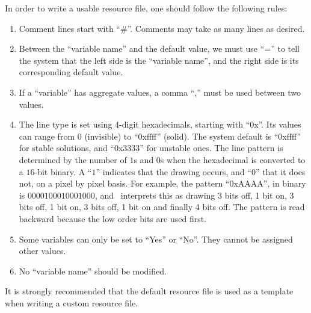 In order to write a usable resource file, one should follow the following rules:
\begin{enumerate}
\item Comment lines start with ``\#''. Comments may take as many lines as desired.
\item Between the ``variable name'' and the default value, we must use 
``='' to tell the system that the left side is the ``variable name'', and
the right side is its corresponding default value.
\item If a ``variable'' has aggregate values, a comma ``,'' must be used between
two values.
\item The line type is set using 4-digit hexadecimals, starting with ``0x''. Its values can 
range from $0$ (invisible) to ``0xffff'' (solid). The system default is ``0xffff'' for stable
solutions, and ``0x3333'' for unstable ones. 
The line pattern is determined by the number of $1$s and $0$s when the hexadecimal
is converted to a $16$-bit binary. A ``$1$'' indicates that the drawing occurs, and ``$0$'' that 
it does not, on a pixel by pixel basis. For example, the pattern ``0xAAAA'', 
in binary is $0000100010001000$, and \PLAUT~interprets this as drawing 
3 bits off, 1 bit on, 3 bits off, 1 bit on, 3 bits off, 1 bit on and finally 4 bits off.
The pattern is read backward because the low order bits are used first.
\item Some variables can only be set to ``Yes'' or ``No''. They cannot be assigned other values.
\item No ``variable name'' should be  modified.
\end{enumerate}

It is strongly recommended that the default resource file is used as a template
when writing a custom resource file. 


